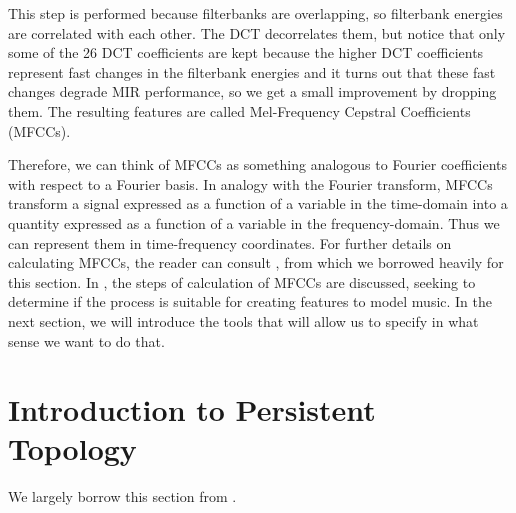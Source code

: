 \documentclass[english, LaM, oneside, noexaminfo]{sapthesis}
\begin{document}
This step is performed because filterbanks are overlapping, so filterbank energies are correlated with each other. The DCT decorrelates them, but notice that only some of the 26 DCT coefficients are kept because the higher DCT coefficients represent fast changes in the filterbank energies and it turns out that these fast changes degrade MIR performance, so we get a small improvement by dropping them. The resulting features are called Mel-Frequency Cepstral Coefficients (MFCCs). 

Therefore, we can think of MFCCs as something analogous to Fourier coefficients with respect to a Fourier basis. In analogy with the Fourier transform, MFCCs transform a signal expressed as a function of a variable in the time-domain into a quantity expressed as a function of a variable in the frequency-domain. Thus we can represent them in time-frequency coordinates.
For further details on calculating MFCCs, the reader can consult \cite{bworld}, from which we borrowed heavily for this section. 
In \cite{logan2000mel}, the steps of calculation of MFCCs are discussed, seeking to determine if the process is suitable for creating features to model music. In the next section, we will introduce the tools that will allow us to specify in what sense we want to do that.


\section{Introduction to Persistent Topology}

We largely borrow this section from \cite{ferri2017persistent}.
\end{document}
